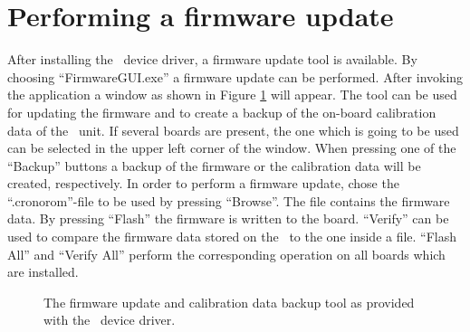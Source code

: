 \section{Performing a firmware update}

After installing the \deviceName\ device driver, a firmware update tool is available.
 By choosing ``FirmwareGUI.exe'' a firmware update can be performed. 
 After invoking the application a window as shown in Figure \ref{fig:Firmware} will appear. 
 The tool can be used for updating the firmware and to create a backup of the on-board calibration data of the \deviceName\ unit. 
 If several boards are present, the one which is going to be used can be selected in the upper left corner of the window. 
 When pressing one of the ``Backup'' buttons a backup of the firmware or the calibration data will be created, respectively. 
 In order to perform a firmware update, chose the ``.cronorom''-file to be used by pressing ``Browse''. 
 The file contains the firmware data. By pressing ``Flash'' the firmware is written to the board. 
 ``Verify'' can be used to compare the firmware data stored on the \deviceName\ to the one inside a file.
 ``Flash All'' and ``Verify All'' perform the corresponding operation on all boards which are installed.\par

\begin{figure}[ht]
    \begin{center}
        \caption{\label{fig:Firmware}The firmware update and calibration data backup tool as provided with the \deviceName\ device driver.}
    \end{center}
\end{figure}

